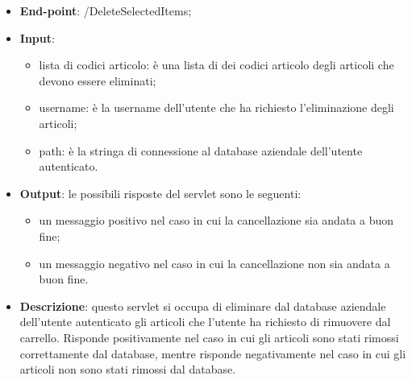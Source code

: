 \begin{itemize}
	\item \textbf{End-point}: /DeleteSelectedItems;
	\item \textbf{Input}:
		\begin{itemize}
			\item lista di codici articolo: è una lista di dei codici articolo degli articoli che devono essere eliminati;
			\item username: è la username dell'utente che ha richiesto l'eliminazione degli articoli;
			\item path: è la stringa di connessione al database aziendale dell'utente autenticato.
		\end{itemize}
	\item \textbf{Output}: le possibili risposte del servlet sono le seguenti:
		\begin{itemize}
			\item un messaggio positivo nel caso in cui la cancellazione sia andata a buon fine;
			\item un messaggio negativo nel caso in cui la cancellazione non sia andata a buon fine.
		\end{itemize}
	\item \textbf{Descrizione}: questo servlet si occupa di eliminare dal database aziendale dell'utente autenticato gli articoli che l'utente ha richiesto di rimuovere dal carrello. Risponde positivamente nel caso in cui gli articoli sono stati rimossi correttamente dal database, mentre risponde negativamente nel caso in cui gli articoli non sono stati rimossi dal database.
\end{itemize}


